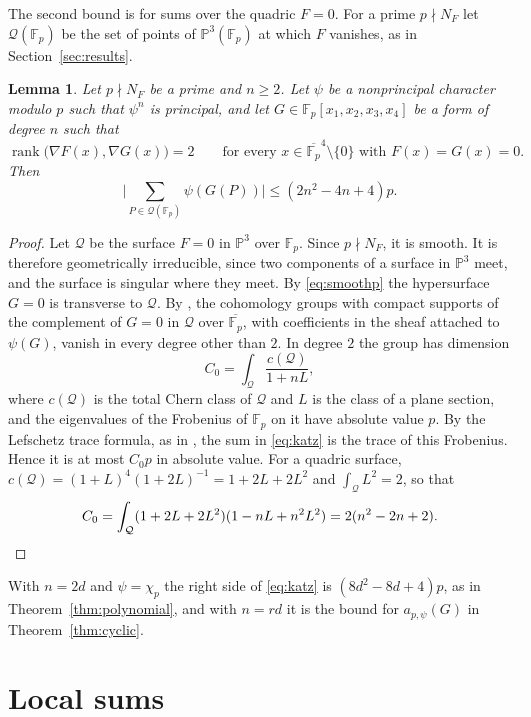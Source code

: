 \documentclass[11pt]{amsart}
\numberwithin{equation}{section}
\numberwithin{figure}{section}
\newtheorem{lemma}{Lemma}[section]
\theoremstyle{definition}
\newcommand{\Fp}{\mathbb F_p}
\newcommand{\PP}{\mathbb P}
\newcommand{\Qc}{\mathcal Q}
\begin{document}
The second bound is for sums over the quadric $F=0$. For a prime
$p\nmid N_F$ let $\Qc(\Fp)$ be the set of points of $\PP^3(\Fp)$ at
which $F$ vanishes, as in Section~\ref{sec:results}.

\begin{lemma}\label{lem:katz}
Let $p\nmid N_F$ be a prime and $n\ge2$. Let $\psi$ be a nonprincipal
character modulo $p$ such that $\psi^n$ is principal, and let
$G\in\Fp[x_1,x_2,x_3,x_4]$ be a form of degree $n$ such that
\begin{equation}\label{eq:smoothp}
 \operatorname{rank}\big(\nabla F(x),\nabla G(x)\big)=2
 \qquad\text{for every }x\in\overline{\Fp}^4\setminus\{0\}
 \text{ with }F(x)=G(x)=0.
\end{equation}
Then
\begin{equation}\label{eq:katz}
 \bigg|\sum_{P\in\Qc(\Fp)}\psi(G(P))\bigg|\le(2n^2-4n+4)p.
\end{equation}
\end{lemma}

\begin{proof}
Let $\Qc$ be the surface $F=0$ in $\PP^3$ over $\Fp$. Since
$p\nmid N_F$, it is smooth. It is therefore geometrically
irreducible, since two components of a surface in $\PP^3$ meet, and
the surface is singular where they meet. By \eqref{eq:smoothp} the
hypersurface $G=0$ is transverse to $\Qc$. By
\cite[Theorem~8.1(1)]{K}, the cohomology groups with compact supports of
the complement of $G=0$ in $\Qc$ over $\overline{\Fp}$, with
coefficients in the sheaf attached to $\psi(G)$, vanish in every
degree other than $2$. In degree $2$ the group has dimension
\[
 C_0=\int_{\Qc}\frac{c(\Qc)}{1+nL},
\]
where $c(\Qc)$ is the total Chern class of $\Qc$ and $L$ is the class
of a plane section, and the eigenvalues of the Frobenius of $\Fp$ on
it have absolute value $p$. By the Lefschetz trace formula, as in
\cite[(5.3)]{K}, the sum in \eqref{eq:katz} is the trace of this
Frobenius. Hence it is at
most $C_0p$ in absolute value. For a quadric surface,
$c(\Qc)=(1+L)^4(1+2L)^{-1}=1+2L+2L^2$ and $\int_{\Qc}L^2=2$, so that
\[
 C_0=\int_{\Qc}(1+2L+2L^2)(1-nL+n^2L^2)=2(n^2-2n+2).\qedhere
\]
\end{proof}

With $n=2d$ and $\psi=\chi_p$ the right side of \eqref{eq:katz} is
$(8d^2-8d+4)p$, as in Theorem~\ref{thm:polynomial}, and with $n=rd$
it is the bound for $a_{p,\psi}(G)$ in Theorem~\ref{thm:cyclic}.

\section{Local sums}\label{sec:local}
\end{document}
